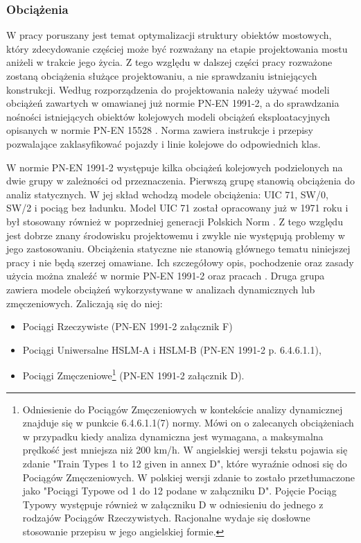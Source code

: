 \subsubsection{Obciążenia} \label{sect: eurokod_obciazenia_dyn}
W pracy poruszany jest temat optymalizacji struktury obiektów mostowych, który zdecydowanie częściej może być rozważany na etapie projektowania mostu aniżeli w trakcie jego życia. Z tego względu w dalszej części pracy rozważone zostaną obciążenia służące projektowaniu, a nie sprawdzaniu istniejących konstrukcji. Według rozporządzenia \parencite{PolskiKomitetNormalizacyjny} do projektowania należy używać modeli obciążeń zawartych w omawianej już normie PN-EN 1991-2, a do sprawdzania nośności istniejących obiektów kolejowych modeli obciążeń eksploatacyjnych opisanych w normie PN-EN 15528 \parencite{PolskiKomitetNormalizacyjnya,uszczki2015}. Norma \cite{PolskiKomitetNormalizacyjnya} zawiera instrukcje i przepisy pozwalające zaklasyfikować pojazdy i linie kolejowe do odpowiednich klas.

W normie PN-EN 1991-2 występuje kilka obciążeń kolejowych podzielonych na dwie grupy w zależności od przeznaczenia. Pierwszą grupę stanowią obciążenia do analiz statycznych. W jej skład wchodzą modele obciążenia: UIC 71, SW/0, SW/2 i pociąg bez ładunku. Model UIC 71 został opracowany już w 1971 roku \parencite{UnionInternationaleDesCheminsDeFer2006} i był stosowany również w poprzedniej generacji Polskich Norm \parencite{PKNe}. Z tego względu jest dobrze znany środowisku projektowemu i zwykle nie występują problemy w jego zastosowaniu. Obciążenia statyczne nie stanowią głównego tematu niniejszej pracy i nie będą szerzej omawiane. Ich szczegółowy opis, pochodzenie oraz zasady użycia można znaleźć w normie PN-EN 1991-2 oraz pracach \parencite{James2003,UnionInternationaleDesCheminsDeFer2006}. Druga grupa zawiera modele obciążeń wykorzystywane w analizach dynamicznych lub zmęczeniowych. Zaliczają się do niej:

\enlargethispage{-3\baselineskip}
\begin{itemize}
	\item Pociągi Rzeczywiste (PN-EN 1991-2 załącznik F)
	\item Pociągi Uniwersalne HSLM-A i HSLM-B (PN-EN 1991-2 p. 6.4.6.1.1),
	\item Pociągi Zmęczeniowe\footnote{
		Odniesienie do Pociągów Zmęczeniowych w kontekście analizy dynamicznej znajduje się w punkcie 6.4.6.1.1(7) normy. Mówi on o zalecanych obciążeniach w przypadku kiedy analiza dynamiczna jest wymagana, a maksymalna prędkość jest mniejsza niż 200 km/h. W angielskiej wersji tekstu pojawia się zdanie "Train Types 1 to 12 given in annex D", które wyraźnie odnosi się do Pociągów Zmęczeniowych. W polskiej wersji zdanie to zostało przetłumaczone jako "Pociągi Typowe od 1 do 12 podane w załączniku D". Pojęcie Pociąg Typowy występuje również w załączniku D w odniesieniu do jednego z rodzajów Pociągów Rzeczywistych. Racjonalne wydaje się dosłowne stosowanie przepisu w jego angielskiej formie.} 
	(PN-EN 1991-2 załącznik D). 
\end{itemize}



